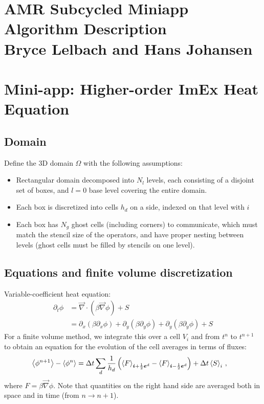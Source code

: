 \documentclass[11pt]{article}
\newcommand{\grad}{\vec{\nabla}}
\begin{document}
\section*{AMR Subcycled Miniapp Algorithm Description \\
          Bryce Lelbach and Hans Johansen}

\section{Mini-app: Higher-order ImEx Heat Equation}

\subsection{Domain}
Define the 3D domain $\Omega$ with the following assumptions:
\begin{itemize}
  \item Rectangular domain decomposed into $N_l$ levels, each
    consisting of a disjoint set of boxes, and $l = 0$ base level covering
    the entire domain.
  \item Each box is discretized into cells $h_d$ on a side, indexed
    on that level with $i$
  \item Each box has $N_g$ ghost cells (including corners) to communicate, 
    which must match the stencil size of the operators, and have proper
    nesting between levels (ghost cells must be filled by stencils on one level).
\end{itemize}

\subsection{Equations and finite volume discretization}
Variable-coefficient heat equation:
\begin{align}
\label{eqn:heat}
  \partial_t \phi 
    & = \grad \cdot \left( \beta \grad \phi \right) + S \\
    & = \partial_x \left( \beta \partial_x \phi \right) 
      + \partial_y \left( \beta \partial_y \phi \right) 
      + \partial_y \left( \beta \partial_y \phi \right) 
      + S
\end{align}
For a finite volume method, we integrate this over a cell $V_i$ and
  from $t^n$ to $t^{n+1}$ to obtain an
  equation for the evolution of the cell averages in terms of fluxes:
\begin{align}
   \left\langle \phi^{n+1} \right\rangle - \left\langle \phi^n \right\rangle 
    & = {\Delta t} \sum_d \frac{1}{h_d} \left( \left\langle F \right\rangle_{{\boldsymbol{i}}+\frac{1}{2}{\boldsymbol{e}}^d} - \left\langle F \right\rangle_{{\boldsymbol{i}}-\frac{1}{2}{\boldsymbol{e}}^d} \right) 
    + {\Delta t} \left\langle S \right\rangle_i \, ,
\end{align}
  where $F = \beta \grad \phi$.
Note that quantities on the right hand side are averaged
  both in space and in time (from ${n \rightarrow {n+1}}$).
\end{document}
